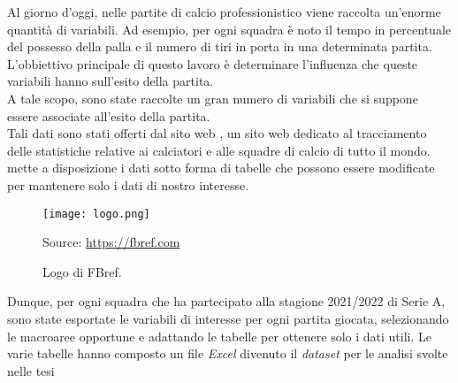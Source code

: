 Al giorno d'oggi, nelle partite di calcio professionistico viene raccolta un'enorme quantità di variabili. Ad esempio, per ogni squadra è noto il tempo in percentuale del possesso della palla e il numero di tiri in porta in una determinata partita. L'obbiettivo principale di questo lavoro è determinare l'influenza che queste variabili hanno sull'esito della partita. \\
A tale scopo, sono state raccolte un gran numero di variabili che si suppone essere associate all'esito della partita.\\
Tali dati sono stati offerti dal sito web \textit{\cite{fbref}}, un sito web dedicato al tracciamento delle statistiche relative ai calciatori e alle squadre di calcio di tutto il mondo. \textit{\cite{fbref}} mette a disposizione i dati sotto forma di tabelle che possono essere modificate per mantenere solo i dati di nostro interesse.\\
\begin{figure}[!htb]
	\begin{center}
		\texttt{[image: logo.png]}
		\caption{Logo di FBref.} 
		Source: \url{https://fbref.com}
		\label{fig:logo}
	\end{center}
\end{figure}



Dunque, per ogni squadra che ha partecipato alla stagione 2021/2022 di Serie A, sono state esportate le variabili di interesse per ogni partita giocata, selezionando le macroaree opportune e adattando le tabelle per ottenere solo i dati utili. Le varie tabelle hanno composto un file \emph{Excel} divenuto il \emph{dataset} per le analisi svolte nelle tesi 

